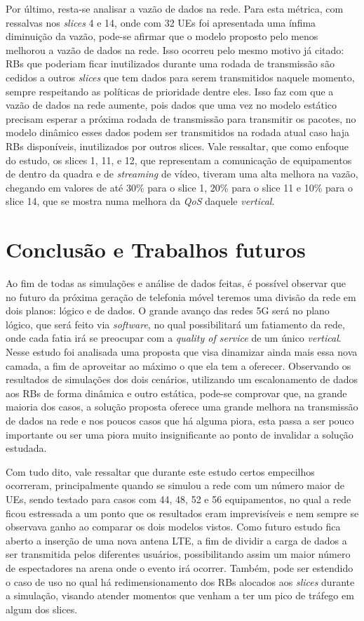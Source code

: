 \documentclass[12pt, a4paper]{article}
\begin{document}
Por último, resta-se analisar a vazão de dados na rede. Para esta métrica, com ressalvas nos \textit{slices} 4 e 14, onde com 32 UEs foi apresentada uma ínfima diminuição da vazão, pode-se afirmar que o modelo proposto pelo menos melhorou a vazão de dados na rede. Isso ocorreu pelo mesmo motivo já citado: RBs que poderiam ficar inutilizados durante uma rodada de transmissão são cedidos a outros \textit{slices} que tem dados para serem transmitidos naquele momento, sempre respeitando as políticas de prioridade dentre eles. Isso faz com que a vazão de dados na rede aumente, pois dados que uma vez no modelo estático precisam esperar a próxima rodada de transmissão para transmitir os pacotes, no modelo dinâmico esses dados podem ser transmitidos na rodada atual caso haja RBs disponíveis, inutilizados por outros slices. Vale ressaltar, que como enfoque do estudo, os slices 1, 11, e 12, que representam a comunicação de equipamentos de dentro da quadra e de \textit{streaming} de vídeo, tiveram uma alta melhora na vazão, chegando em valores de até 30\% para o slice 1, 20\% para o slice 11 e 10\% para o slice 14, que se mostra numa melhora da \textit{QoS} daquele \textit{vertical}.

\section{Conclusão e Trabalhos futuros}

Ao fim de todas as simulações e análise de dados feitas, é possível observar que no futuro da próxima geração de telefonia móvel teremos uma divisão da rede em dois planos: lógico e de dados. O grande avanço das redes 5G será no plano lógico, que será feito via \textit{software}, no qual possibilitará um fatiamento da rede, onde cada fatia irá se preocupar com a \textit{quality of service} de um único \textit{vertical}. Nesse estudo foi analisada uma proposta que visa dinamizar ainda mais essa nova camada, a fim de aproveitar ao máximo o que ela tem a oferecer. Observando os resultados de simulações dos dois cenários, utilizando um escalonamento de dados aos RBs de forma dinâmica e outro estática, pode-se comprovar que, na grande maioria dos casos, a solução proposta oferece uma grande melhora na transmissão de dados na rede e nos poucos casos que há alguma piora, esta passa a ser pouco importante ou ser uma piora muito insignificante ao ponto de invalidar a solução estudada.

Com tudo dito, vale ressaltar que durante este estudo certos empecilhos ocorreram, principalmente quando se simulou a rede com um número maior de UEs, sendo testado para casos com 44, 48, 52 e 56 equipamentos, no qual a rede ficou estressada a um ponto que os resultados eram imprevisíveis e nem sempre se observava ganho ao comparar os dois modelos vistos. Como futuro estudo fica aberto a inserção de uma nova antena LTE, a fim de dividir a carga de dados a ser transmitida pelos diferentes usuários, possibilitando assim um maior número de espectadores na arena onde o evento irá ocorrer. Também, pode ser estendido o caso de uso no qual há redimensionamento dos RBs alocados aos \textit{slices} durante a simulação, visando atender momentos que venham a ter um pico de tráfego em algum dos slices.
\end{document}
